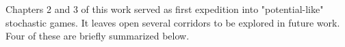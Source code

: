 Chapters 2 and 3 of this work served as first expedition into "potential-like" stochastic games. It leaves open several corridors to be explored in future work. Four of these are briefly summarized below. 
